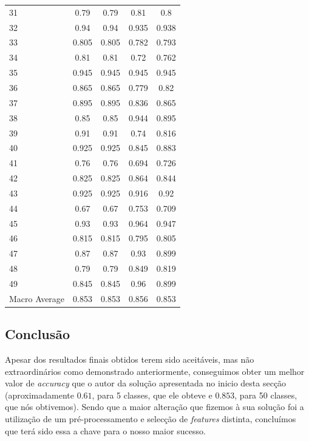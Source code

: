 \begin{table}[!t]
\begin{center}
\begin{tabular}{l c c c c}
31 & 0.79 & 0.79 & 0.81 & 0.8\\
32 & 0.94 & 0.94 & 0.935 & 0.938\\
33 & 0.805 & 0.805 & 0.782 & 0.793\\
34 & 0.81 & 0.81 & 0.72 & 0.762\\
35 & 0.945 & 0.945 & 0.945 & 0.945\\
36 & 0.865 & 0.865 & 0.779 & 0.82\\
37 & 0.895 & 0.895 & 0.836 & 0.865\\
38 & 0.85 & 0.85 & 0.944 & 0.895\\
39 & 0.91 & 0.91 & 0.74 & 0.816\\
40 & 0.925 & 0.925 & 0.845 & 0.883\\
41 & 0.76 & 0.76 & 0.694 & 0.726\\
42 & 0.825 & 0.825 & 0.864 & 0.844\\
43 & 0.925 & 0.925 & 0.916 & 0.92\\
44 & 0.67 & 0.67 & 0.753 & 0.709\\
45 & 0.93 & 0.93 & 0.964 & 0.947\\
46 & 0.815 & 0.815 & 0.795 & 0.805\\
47 & 0.87 & 0.87 & 0.93 & 0.899\\
48 & 0.79 & 0.79 & 0.849 & 0.819\\
49 & 0.845 & 0.845 & 0.96 & 0.899\\
\hline
Macro Average & 0.853 & 0.853 & 0.856 & 0.853\\
\end{tabular}
\label{tab:bayes_perforamnce}
\end{center}
\end{table}


\subsection{Conclusão}

Apesar dos resultados finais obtidos terem sido aceitáveis, mas não extraordinários como demonstrado anteriormente, conseguimos obter um melhor valor de \textit{accuracy} que o autor da solução apresentada no inicio desta secção (aproximadamente $0.61$, para 5 classes, que ele obteve e $0.853$, para 50 classes, que nós obtivemos). Sendo que a maior alteração que fizemos à sua solução foi a utilização de um pré-processamento e selecção de \textit{features} distinta, concluímos que terá sido essa a chave para o nosso maior sucesso.
